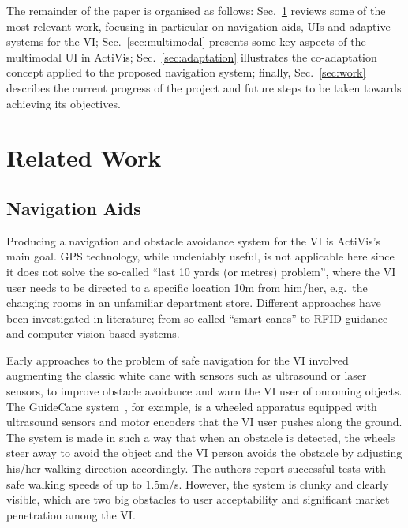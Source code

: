 \documentclass[letterpaper]{article}
\begin{document}
The remainder of the paper is organised as follows: Sec.~\ref{sec:literature} reviews some of the most relevant work, focusing in particular on navigation aids, UIs and adaptive systems for the VI; Sec.~\ref{sec:multimodal} presents some key aspects of the multimodal UI in ActiVis; Sec.~\ref{sec:adaptation} illustrates the co-adaptation concept applied to the proposed navigation system; finally, Sec.~\ref{sec:work} describes the current progress of the project and future steps to be taken towards achieving its objectives.

\section{Related Work}\label{sec:literature}

\subsection{Navigation Aids}

Producing a navigation and obstacle avoidance system for the VI is ActiVis's main goal. GPS technology, while undeniably useful, is not applicable here since it does not solve the so-called ``last 10 yards (or metres) problem'', where the VI user needs to be directed to a specific location 10m from him/her, e.g.\ the changing rooms in an unfamiliar department store. Different approaches have been investigated in literature; from so-called ``smart canes'' to RFID guidance and computer vision-based systems.

Early approaches to the problem of safe navigation for the VI involved augmenting the classic white cane with sensors such as ultrasound or laser sensors, to improve obstacle avoidance and warn the VI user of oncoming objects. The GuideCane system~\cite{ulrich1997}, for example, is a wheeled apparatus equipped with ultrasound sensors and motor encoders that the VI user pushes along the ground. The system is made in such a way that when an obstacle is detected, the wheels steer away to avoid the object and the VI person avoids the obstacle by adjusting his/her walking direction accordingly. The authors report successful tests with safe walking speeds of up to 1.5m/s. However, the system is clunky and clearly visible, which are two big obstacles to user acceptability and significant market penetration among the VI.
\end{document}
